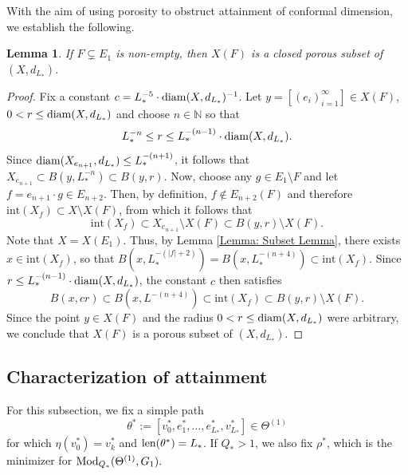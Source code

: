 \documentclass{amsart}
\newcommand{\diam}{{\rm diam}}
\newcommand{\len}{{\rm len}}
\newcommand{\Mod}{{\rm Mod}}
\newtheorem{lemma}[equation]{Lemma}
\numberwithin{equation}{section}
\theoremstyle{definition}
\theoremstyle{remark}
\newcommand{\N}{\mathbb{N}}
\begin{document}
    With the aim of using porosity to obstruct attainment of conformal dimension, we establish the following.

\begin{lemma}\label{Lemma: Porous}
    If \(F\subsetneq E_1\) is non-empty, then \(X(F)\) is a closed porous subset of \((X,d_{L_*})\).
\end{lemma}
\begin{proof} 
    Fix a constant \(c=L_*^{-5}\cdot\diam(X,d_{L_*})^{-1}\). Let \(y=[(e_i)_{i=1}^\infty]\in X(F)\), \(0<r\leq \diam(X,d_{L_*})\) and choose \(n\in\N\) so that
        \[
            L_*^{-n}\leq r\leq L_*^{-(n-1)}\cdot \diam(X,d_{L_*}).
        \]
    Since \(\diam(X_{e_{n+1}},d_{L_*})\leq L_*^{-(n+1)}\), it follows that \(X_{e_{n+1}}\subset B(y,L_*^{-n})\subset B(y,r)\). Now, choose any \(g\in E_1\setminus F\) and let \(f=e_{n+1}\cdot g\in E_{n+2}\). Then, by definition, \(f\not\in E_{n+2}(F)\) and therefore \(\mathrm{int}(X_f)\subset X\setminus X(F)\), from which it follows that
        \[
            \mathrm{int}(X_f)\subset X_{e_{n+1}}\setminus X(F)\subset B(y,r)\setminus X(F).
        \]
    Note that \(X=X(E_1)\). Thus, by Lemma \ref{Lemma: Subset Lemma}, there exists \(x\in \mathrm{int}(X_f)\), so that \(B(x,L_*^{-(\lvert f\rvert+2)})=B(x,L_*^{-(n+4)})\subset \mathrm{int}(X_f)\). Since \(r\leq L_*^{-(n-1)}\cdot \diam(X,d_{L_*})\), the constant \(c\) then satisfies 
        \[
            B(x,cr)\subset B(x,L^{-(n+4)})\subset\mathrm{int}(X_f)\subset B(y,r)\setminus X(F).
        \]
    Since the point \(y\in X(F)\) and the radius \(0<r\leq \diam(X,d_{L_*})\) were arbitrary, we conclude that \(X(F)\) is a porous subset of \((X,d_{L_*})\).
\end{proof}

\subsection{Characterization of attainment}
    For this subsection, we fix a simple path
        \[
            \theta^*:=[v^*_0,e^*_1,\ldots,e^*_{L_*},v^*_{L_*}]\in \Theta^{(1)}
        \]
    for which \(\eta(v^*_0)=v^*_k\) and \(\len(\theta^*)=L_*\). If $Q_*>1$, we also fix $\rho^*$, which is the minimizer for $\Mod_{Q_*}(\Theta^{(1)}, G_1).$
    
\end{document}
